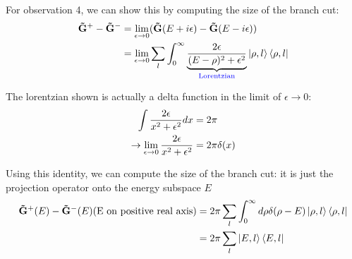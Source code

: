 \documentclass[11pt]{article}
\theoremstyle{definition}
\begin{document}
For observation 4, we can show this by computing the size of the branch cut:
\begin{align}
\mathbf{\tilde{G}}^+ - \mathbf{\tilde{G}}^- &= \lim_{\epsilon \rightarrow 0} (\mathbf{\tilde{G}}(E + i \epsilon) - \mathbf{\tilde{G}}(E- i \epsilon)) \\
& = \lim_{\epsilon \rightarrow 0}\sum_l \int_0^\infty \underbrace{2 \epsilon \over (E - \rho)^2 + \epsilon^2}_{\text{\color{blue} Lorentzian}} \ket{\rho, l} \bra{\rho, l}
\end{align}

The lorentzian shown is actually a delta function in the limit of $\epsilon \rightarrow 0$:
\begin{align}
 \int {2 \epsilon \over x^2 + \epsilon^2} dx & = 2 \pi \\
\rightarrow  \lim_{\epsilon \rightarrow 0}  {2 \epsilon \over x^2 + \epsilon^2} &= 2 \pi \delta(x)
\end{align}

Using this identity, we can compute the size of the branch cut: it is just the projection operator onto the energy subspace $E$
\begin{align}
\mathbf{\tilde{G}}^+(E) - \mathbf{\tilde{G}}^-(E) \text{(E on positive real axis)} &= 2\pi \sum_l \int_0^\infty d\rho  \delta(\rho - E) \ket{\rho, l} \bra{\rho, l} \\
 &=2 \pi \sum_l \ket{E, l} \bra{E, l} 
\end{align}
\end{document}

